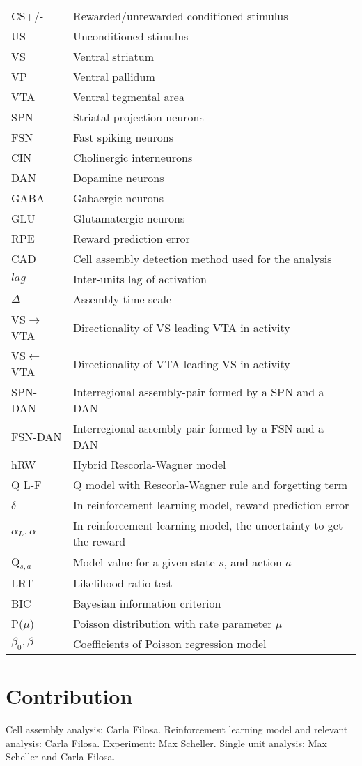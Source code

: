 \begin{tabular}{l l}
CS+/- &{Rewarded/unrewarded conditioned stimulus}\\
US &{Unconditioned stimulus}\\
VS &{Ventral striatum}\\
VP &{Ventral pallidum}\\
VTA &{Ventral tegmental area}\\
SPN &{Striatal projection neurons}\\
FSN &{Fast spiking neurons}\\
CIN &{Cholinergic interneurons}\\
DAN &{Dopamine neurons}\\
GABA &{Gabaergic neurons}\\
GLU &{Glutamatergic neurons}\\
RPE &{Reward prediction error}\\
CAD &{Cell assembly detection method used for the analysis}\\
$lag$ &{Inter-units lag of activation}\\
$\Delta$ &{Assembly time scale}\\
VS$\rightarrow$VTA &{Directionality of VS leading VTA in activity}\\
VS$\leftarrow$VTA &{Directionality of VTA leading VS in activity}\\
SPN-DAN &{Interregional assembly-pair formed by a SPN and a DAN}\\
FSN-DAN &{Interregional assembly-pair formed by a FSN and a DAN}\\
hRW &{Hybrid Rescorla-Wagner model}\\
Q L-F &{Q model with Rescorla-Wagner rule and forgetting term}\\
$\delta$ &{In reinforcement learning model, reward prediction error}\\
$\alpha_L,\alpha$ &{In reinforcement learning model, the uncertainty to get the reward}\\
Q$_{s,a}$ &{Model value for a given state $s$, and action $a$}\\
LRT &{Likelihood ratio test}\\
BIC &{Bayesian information criterion}\\
P($\mu$) &{Poisson distribution with rate parameter $\mu$}\\
$\beta_0,\beta$ &{Coefficients of Poisson regression model}\\
\end{tabular}
\vspace{4cm}
\pagebreak
\vspace{2cm}
\section*{Contribution}
Cell assembly analysis: Carla Filosa. Reinforcement learning model and relevant analysis: Carla Filosa. Experiment: Max Scheller. Single unit analysis: Max Scheller and Carla Filosa. 